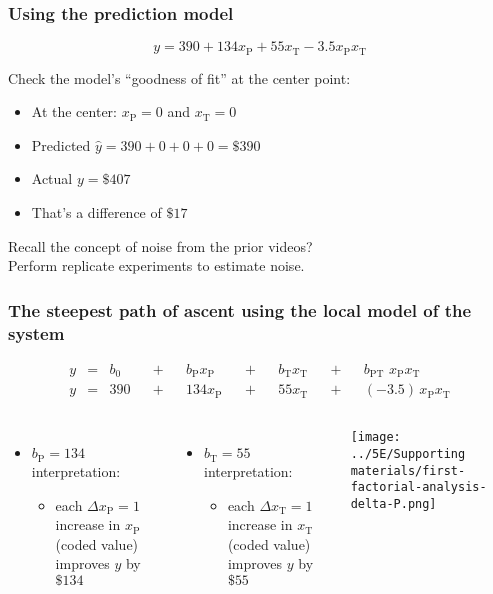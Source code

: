 \begin{frame}\frametitle{Using the prediction model}
	\[y = 390 + 134 x_\text{P} + 55 x_\text{T} - 3.5x_\text{P}x_\text{T} \]
	
	\vspace{1cm}
	Check the model's ``goodness of fit'' at the center point:
	\begin{itemize}
		\item	At the center: $x_\text{P}=0$ and $x_\text{T}=0$ \pause
		\item	Predicted $ \hat{y} = 390 + 0 + 0 + 0 = \$390$
		\item	Actual $y = \$407$ \pause
		\item	That's a difference of $\$17$
	\end{itemize}
	
	 \pause
	\vspace{1cm}
	Recall the concept of noise from the prior videos?\\
	Perform replicate experiments to estimate noise.
\end{frame}

\begin{frame}\frametitle{The steepest {\color{myOrange}path of ascent} using the local model of the system}

	\begin{exampleblock}{}
		\begin{align*} 
			y &=& b_0 &&+&& b_\text{P} x_\text{P} &&+&& b_\text{T} x_\text{T} &&+&& b_\text{PT}\,\,x_\text{P}x_\text{T} \\
			y &=& 390 &&+&& 134 x_\text{P}        &&+&& 55 x_\text{T}         &&+&& (-3.5)\,x_\text{P}x_\text{T} 
		\end{align*}		
	\end{exampleblock}
	
	\begin{columns}[c]
			\begin{itemize}
				\item	$b_\text{P} =134$ interpretation:
				\begin{itemize}
					\item	each $\Delta x_\text{P} = 1$ increase in $x_\text{P}$ (coded value) improves $y$ by $\$134$
				\end{itemize}
			\end{itemize}
			\pause
			\begin{itemize}
				\item	$b_\text{T} = 55$ interpretation:
				\begin{itemize}
					\item	each $\Delta x_\text{T} = 1$ increase in $x_\text{T}$ (coded value)  improves $y$ by $\$55$
				\end{itemize}
			\end{itemize}
			\centerline{\texttt{[image: ../5E/Supporting materials/first-factorial-analysis-delta-P.png]}}
	\end{columns}
\end{frame}

